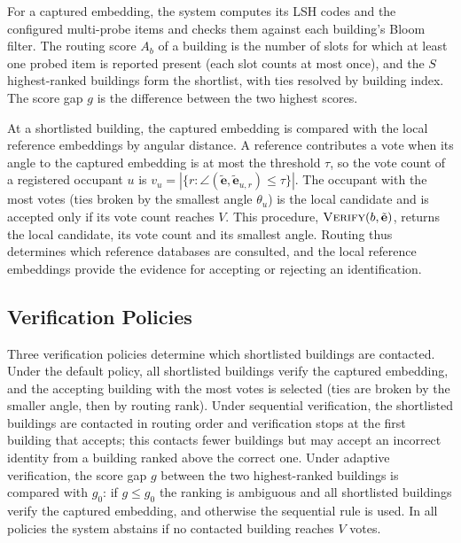 \documentclass[pdflatex,sn-mathphys-num]{sn-jnl}%
\theoremstyle{thmstyleone}%
\theoremstyle{thmstyletwo}%
\theoremstyle{thmstylethree}%
\begin{document}
For a captured embedding, the system computes its LSH codes and the configured multi-probe items and checks them against each building's Bloom filter. The routing score $A_b$ of a building is the number of slots for which at least one probed item is reported present (each slot counts at most once), and the $S$ highest-ranked buildings form the shortlist, with ties resolved by building index. The score gap $g$ is the difference between the two highest scores.

At a shortlisted building, the captured embedding is compared with the local reference embeddings by angular distance. A reference contributes a vote when its angle to the captured embedding is at most the threshold $\tau$, so the vote count of a registered occupant $u$ is $v_u=|\{r:\angle(\tilde{\mathbf{e}},\tilde{\mathbf{e}}_{u,r})\leq\tau\}|$. The occupant with the most votes (ties broken by the smallest angle $\theta_u$) is the local candidate and is accepted only if its vote count reaches $V$. This procedure, $\textsc{Verify}(b,\tilde{\mathbf{e}})$, returns the local candidate, its vote count and its smallest angle. Routing thus determines which reference databases are consulted, and the local reference embeddings provide the evidence for accepting or rejecting an identification.

\subsection{Verification Policies}
\label{subsec:verification_policies}

Three verification policies determine which shortlisted buildings are contacted. Under the default policy, all shortlisted buildings verify the captured embedding, and the accepting building with the most votes is selected (ties are broken by the smaller angle, then by routing rank). Under sequential verification, the shortlisted buildings are contacted in routing order and verification stops at the first building that accepts; this contacts fewer buildings but may accept an incorrect identity from a building ranked above the correct one. Under adaptive verification, the score gap $g$ between the two highest-ranked buildings is compared with $g_0$: if $g\le g_0$ the ranking is ambiguous and all shortlisted buildings verify the captured embedding, and otherwise the sequential rule is used. In all policies the system abstains if no contacted building reaches $V$ votes.

\end{document}

